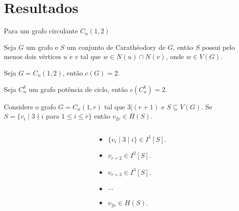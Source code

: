 \section{Resultados}
\begin{frame}{Para um grafo circulante $C_n(1,2)$}
    \begin{fato}
        \label{fact-carat}
        Seja $G$ um grafo e $S$ um conjunto de Carathéodory de $G$, então $S$ possui pelo menos dois vértices $u$ e $v$ tal que $w\in N(u)\cap N(v)$, onde $w \in V(G)$.
    \end{fato}

    \begin{lema}
        \label{lemma-circ-1-2}
        Seja $G = C_n(1,2)$, então $c(G)=2$.
    \end{lema}

    \begin{proposition}
        Seja $C_n^k$ um grafo potência de ciclo, então $c(C_n^k) = 2$.
    \end{proposition}
\end{frame}




\begin{frame}{}
    \begin{lema}
        \label{lemma-circ-1-r}
        Considere o grafo $G = C_n(1,r)$ tal que $3 | (r+1)$ e $S \subseteq V(G)$. Se $S = \{v_i \;|\; 3 \nmid i$ para $1\le i \le r\}$ então $v_{2r} \in H(S)$.
    \end{lema}
    
    \begin{columns}[T]
        \begin{column}{0.7\textwidth}
            \resizebox{\textwidth}{!}{
                
            }



        \end{column}
        \begin{column}{0.3\textwidth}
            \begin{itemize}
                \item<2-> $\{ v_i \; | \; 3 \mid i \} \in I^1[S]$.
                \item<3-> $v_{r+2} \in I^2[S]$.
                \item<4-> $v_{r+3} \in I^3[S]$.
                \item<5-> $\cdots$
                \item<5-> $v_{2r} \in H(S)$.
            \end{itemize}
        \end{column}
    \end{columns}
\end{frame}

